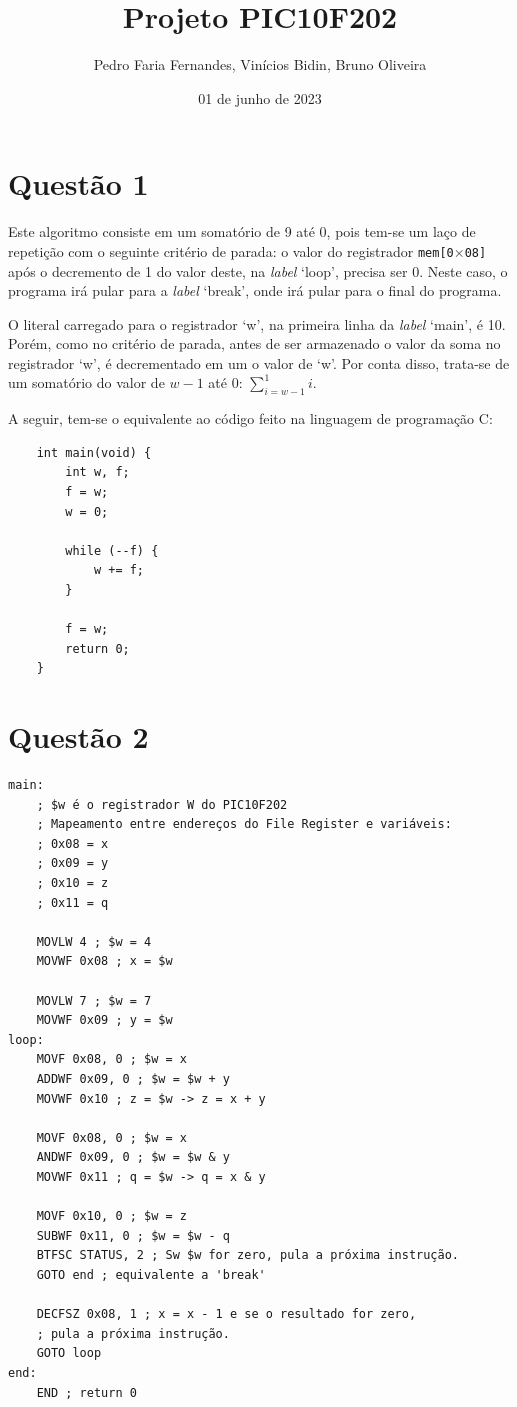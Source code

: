 \documentclass[12pt]{report}
\title{Projeto PIC10F202}
\author{Pedro Faria Fernandes, Vinícios Bidin, Bruno Oliveira}
\date{01 de junho de 2023}
\begin{document}
	\maketitle
	\section*{Questão 1}
		Este algoritmo consiste em um somatório de 9 até 0, pois tem-se um laço de repetição com o seguinte critério de parada: o valor do registrador \texttt{mem[0$\times$08]}
		após o decremento de 1 do valor deste, na \textit{label} `loop', precisa ser 0. Neste caso, o programa irá pular para a \textit{label} `break', onde irá pular para o final do programa.

		O literal carregado para o registrador `w', na primeira linha da \textit{label} `main', é 10. Porém, como no critério de parada, antes de ser armazenado o valor da soma no registrador `w', é decrementado em um o valor de `w'. Por conta disso, trata-se de um somatório do valor de $w - 1$ até 0: $\sum\limits_{i=w-1}^{1}i$.

		A seguir, tem-se o equivalente ao código feito na linguagem de programação C:\@
	\begin{verbatim}
	int main(void) {
		int w, f;
		f = w;
		w = 0;

		while (--f) {
			w += f;
		}

		f = w;
		return 0;
	}
	\end{verbatim}
	\clearpage
	\section*{Questão 2}
		\begin{verbatim}
main:
    ; $w é o registrador W do PIC10F202
    ; Mapeamento entre endereços do File Register e variáveis: 
    ; 0x08 = x
    ; 0x09 = y
    ; 0x10 = z
    ; 0x11 = q

    MOVLW 4 ; $w = 4
    MOVWF 0x08 ; x = $w

    MOVLW 7 ; $w = 7
    MOVWF 0x09 ; y = $w
loop:
    MOVF 0x08, 0 ; $w = x
    ADDWF 0x09, 0 ; $w = $w + y
    MOVWF 0x10 ; z = $w -> z = x + y
		
    MOVF 0x08, 0 ; $w = x
    ANDWF 0x09, 0 ; $w = $w & y
    MOVWF 0x11 ; q = $w -> q = x & y
		
    MOVF 0x10, 0 ; $w = z
    SUBWF 0x11, 0 ; $w = $w - q
    BTFSC STATUS, 2 ; Sw $w for zero, pula a próxima instrução. 
    GOTO end ; equivalente a 'break'
		
    DECFSZ 0x08, 1 ; x = x - 1 e se o resultado for zero,
    ; pula a próxima instrução.
    GOTO loop
end:
    END ; return 0
		\end{verbatim}
\end{document}
